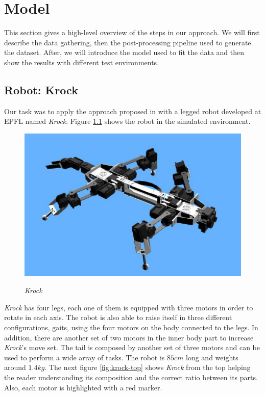 \documentclass[../document.tex]{subfiles}
\begin{document}
\chapter{Model}
This section gives a high-level overview of the steps in our approach. We will first describe the data gathering,  then the post-processing pipeline used to generate the dataset. After, we will introduce the model used to fit the data and then show the results with different test environments.
\section{Robot: Krock}
Our task was to apply the approach proposed in \cite{omar@traversability} with a legged robot developed at EPFL named 
\emph{Krock}. Figure \ref{fig:krock} shows the robot in the simulated environment.
\begin{figure}[H]
    \centering
    \includegraphics[width=0.5\linewidth]{img/krock-1.jpg}
    \label{fig:krock}
    \caption{\emph{Krock}}
\end{figure}
\emph{Krock} has four legs, each one of them is equipped with three motors in order to rotate in each axis. The robot is also able to raise itself in three different configurations, gaits, using the four motors on the body connected to the legs. In addition, there are another set of two motors in the inner body part to increase \emph{Krock}'s move set. 
The tail is composed by another set of three motors and can be used to perform a wide array of tasks.
The robot is $85cm$ long and weights around $1.4kg$. The next figure \ref{fig:krock-top} shows \emph{Krock} from the top helping the reader understanding its composition and the correct ratio between its parts. Also, each motor is highlighted with a red marker.
\end{document}

